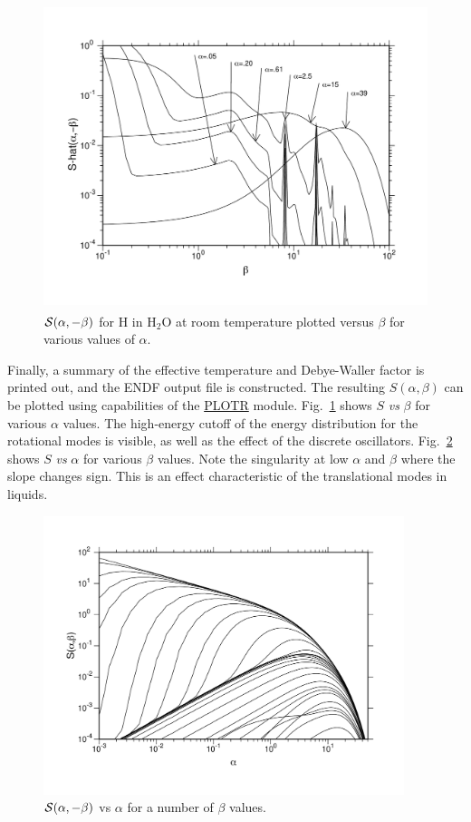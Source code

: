 \begin{figure}[b]\centering
\includegraphics[keepaspectratio, height=3.5in, angle=0]{figs/hh2o-saack}
\caption[${\cal S}(\alpha,-\beta)$ for H in H$_2$O at room temperature]
{${\cal S}(\alpha,-\beta)$ for H in H$_2$O at room temperature plotted versus
 $\beta$ for various values of $\alpha$.}
\label{hh2o-sa}
\end{figure}

Finally, a summary of the effective temperature and Debye-Waller factor
is printed out, and the ENDF output file is constructed.  The
resulting $S(\alpha,\beta)$ can be plotted using capabilities
of the \hyperlink{sPLOTRhy}{PLOTR} module.  Fig.~\ref{hh2o-sa}
shows $S$ {\it vs}
$\beta$ for various $\alpha$ values.  The high-energy cutoff of the
energy distribution for the rotational modes is visible, as well
as the effect of the discrete oscillators.  Fig.~\ref{hh2o-sb} shows
$S$ {\it vs} $\alpha$ for various $\beta$ values.  Note the singularity
at low $\alpha$ and $\beta$ where the slope changes sign.  This is
an effect characteristic of the translational modes in liquids.

\begin{figure}[t]\centering
\includegraphics[keepaspectratio, height=3.2in, angle=0]{figs/hh2o-sback}
\caption[S-hat vs beta]
  {${\cal S}(\alpha,-\beta)$ vs $\alpha$ for a number of $\beta$ values.}
\label{hh2o-sb}
\end{figure}

